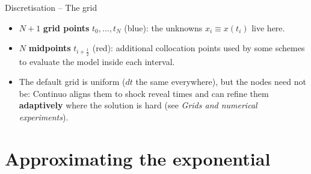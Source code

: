 \documentclass[11pt,aspectratio=169]{beamer}
\begin{document}
\begin{frame}{Discretisation -- The grid}

\begin{center}
\end{center}

\begin{itemize}

\item $N{+}1$ \textbf{grid points} $t_0,\ldots,t_N$ (blue): the
  unknowns $x_i \equiv x(t_i)$ live here.\newline

\item $N$ \textbf{midpoints} $t_{i+\frac12}$ (red): additional
  collocation points used by some schemes to evaluate the model
  inside each interval.\newline

\item The default grid is uniform ($dt$ the same everywhere), but the
  nodes need not be: Continuo aligns them to shock reveal times and can
  refine them \textbf{adaptively} where the solution is hard (see
  \emph{Grids and numerical experiments}).

\end{itemize}

\end{frame}

\section{Approximating the exponential}
\end{document}
